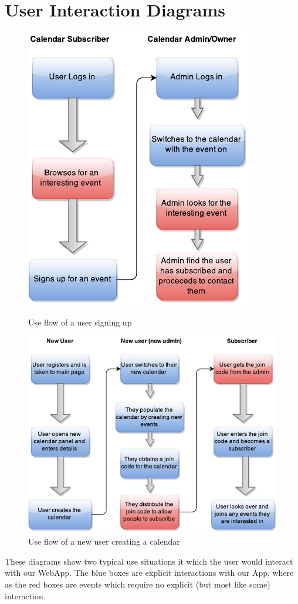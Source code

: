 \documentclass[10pt,a4paper]{article}
\begin{document}
\section{User Interaction Diagrams}
\label{sec:fd}
\begin{figure}[H]
\centering
\begin{minipage}{.4\textwidth}
  \centering
  \includegraphics[width=1\linewidth]{user_event}
  \caption{Use flow of a user signing up}
\end{minipage}%
\begin{minipage}{.7\textwidth}
  \centering
  \includegraphics[width=0.9\linewidth]{calendar_user}
  \caption{Use flow of a new user creating a calendar}
\end{minipage}
\end{figure}
\noindent These diagrams show two typical use situations it which the user would interact with our WebApp. The blue boxes are explicit interactions with our App, where as the red boxes are events which require no explicit (but most like some) interaction.
\end{document}
